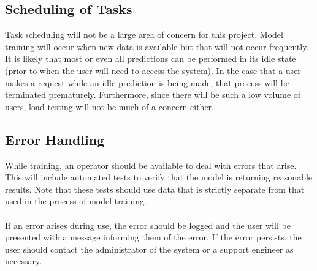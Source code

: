 \documentclass[titlepage]{article}
\begin{document}
\subsection{Scheduling of Tasks}
Task scheduling will not be a large area of concern for this project. Model training will occur when new data is available but that will not occur frequently. It is likely that most or even all predictions can be performed in its idle state (prior to when the user will need to access the system). In the case that a user makes a request while an idle prediction is being made, that process will be terminated prematurely. Furthermore, since there will be such a low volume of users, load testing will not be much of a concern either.
\subsection{Error Handling}
While training, an operator should be available to deal with errors that arise. This will include automated tests to verify that the model is returning reasonable results. Note that these tests should use data that is strictly separate from that used in the process of model training.\\~\\
If an error arises during use, the error should be logged and the user will be presented with a message informing them of the error. If the error persists, the user should contact the administrator of the system or a support engineer as necessary.
\end{document}
